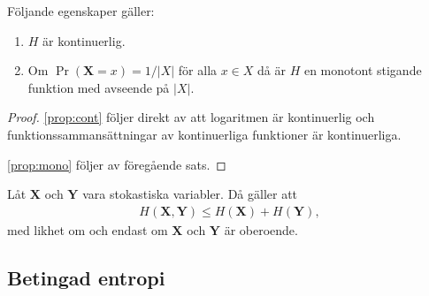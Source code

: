 \documentclass{beamer}
\theoremstyle{definition}
\let\stoch\mathbf{}
\begin{document}
\begin{frame}{\insertsubsectionhead}
  \begin{theorem}
    Följande egenskaper gäller:
    \begin{enumerate}
      \item\label{prop:cont} \(H\) är kontinuerlig.
      \item\label{prop:mono} Om \(\Pr(\stoch X = x) = 1/|X|\) för alla \(x\in 
        X\) då är \(H\) en monotont stigande funktion med avseende på \(|X|\).
    \end{enumerate}
  \end{theorem}

  \begin{proof}
    \eqref{prop:cont} följer direkt av att logaritmen är kontinuerlig och 
    funktionssammansättningar av kontinuerliga funktioner är kontinuerliga.

    \eqref{prop:mono} följer av föregående sats.
  \end{proof}
\end{frame}

\begin{frame}{\insertsubsectionhead}
  \begin{lemma}
    Låt \(\stoch X\) och \(\stoch Y\) vara stokastiska variabler.
    Då gäller att
    \begin{align*}
      H(\stoch X, \stoch Y)\leq H(\stoch X) + H(\stoch Y),
    \end{align*}
    med likhet om och endast om \(\stoch X\) och \(\stoch Y\) är oberoende.
  \end{lemma}
\end{frame}

%
%

\subsection{Betingad entropi}
\end{document}
